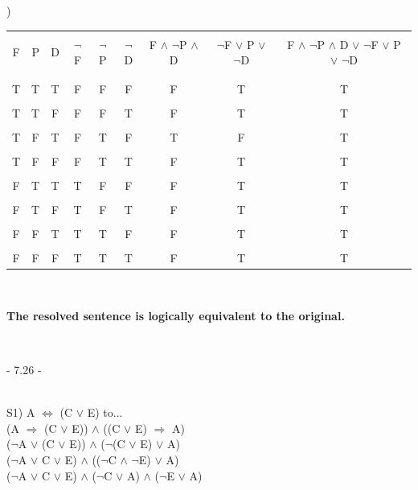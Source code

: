 \documentclass[12pt]{article}
\begin{document}
) 
\begin{tabular}{|c|c|c||c|c|c||c||c||c|}
	\hline &&&&&&&&\\[-1em]
F & P & D &  $\neg$F  &  $\neg$P  &  $\neg$D  &  F $\wedge$ $\neg$P $\wedge$ D  &  $\neg$F $\vee$ P $\vee$ $\neg$D & F $\wedge$ $\neg$P $\wedge$ D  $\vee$  $\neg$F $\vee$ P $\vee$ $\neg$D\\
	\hline &&&&&&&&\\[-1em]
	\hline &&&&&&&&\\[-1em]
T&T&T&F&F&F&F&T&T\\
	\hline &&&&&&&&\\[-1em]
T&T&F&F&F&T&F&T&T\\
	\hline &&&&&&&&\\[-1em]
T&F&T&F&T&F&T&F&T\\
	\hline &&&&&&&&\\[-1em]
T&F&F&F&T&T&F&T&T\\
	\hline &&&&&&&&\\[-1em]
F&T&T&T&F&F&F&T&T\\
	\hline &&&&&&&&\\[-1em]
F&T&F&T&F&T&F&T&T\\
	\hline &&&&&&&&\\[-1em]
F&F&T&T&T&F&F&T&T\\
	\hline &&&&&&&&\\[-1em]
F&F&F&T&T&T&F&T&T\\
	\hline
\end{tabular}\\
\begin{center}\textbf{The resolved sentence is logically equivalent to the original.}\\[.4em]\end{center}



\noindent \hrulefill \\



\centerline{- 7.26 - }
\ \\
\noindent S1) A $\Leftrightarrow$ (C $\vee$ E) to...\\
\indent (A $\Rightarrow$ (C $\vee$ E)) $\wedge$ ((C $\vee$ E) $\Rightarrow$ A)\\
\indent ($\neg$A $\vee$ (C $\vee$ E)) $\wedge$ ($\neg$(C $\vee$ E) $\vee$ A)\\
\indent ($\neg$A $\vee$ C $\vee$ E) $\wedge$ (($\neg$C $\wedge$ $\neg$E) $\vee$ A)\\
\indent ($\neg$A $\vee$ C $\vee$ E) $\wedge$ ($\neg$C $\vee$ A) $\wedge$ ($\neg$E $\vee$ A)\\[.4em]
\end{document}
